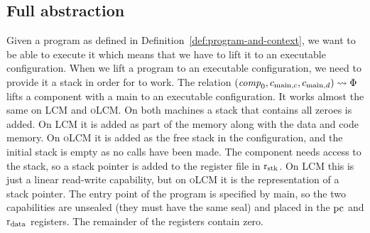 \documentclass[acmsmall,review,anonymous]{acmart}\settopmatter{printfolios=true,printccs=false,printacmref=false}
\renewcommand{\comp}{\var{comp}}
\newcommand{\trgcm}{\textsc{LCM}}
\newcommand{\srccm}{\textsc{oLCM}}
\begin{document}
\subsection{Full abstraction}


Given a program as defined in Definition~\ref{def:program-and-context}, we want to be able to execute it which means that we have to lift it to an executable configuration.
When we lift a program to an executable configuration, we need to provide it a stack in order for \stktokens{} to work.
The relation $(\comp_0, c_{\mathrm{main},c}, c_{\mathrm{main},d}) \rightsquigarrow \Phi$ lifts a component with a main to an executable configuration.
It works almost the same on \trgcm{} and \srccm{}.
On both machines a stack that contains all zeroes is added.
On \trgcm{} it is added as part of the memory along with the data and code memory.
On \srccm{} it is added as the free stack in the configuration, and the initial stack is empty as no calls have been made.
The component needs access to the stack, so a stack pointer is added to the register file in $\mathrm{r}_\mathrm{stk}$.
On \trgcm{} this is just a linear read-write capability, but on \srccm{} it is the representation of a stack pointer.
The entry point of the program is specified by main, so the two capabilities are unsealed (they must have the same seal) and placed in the $\mathrm{pc}$ and $\mathrm{r}_\mathrm{data}$ registers.
The remainder of the registers contain zero.
\end{document}
